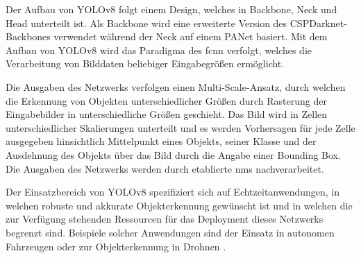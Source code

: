 Der Aufbau von YOLOv8 folgt einem Design, welches in Backbone, Neck und Head unterteilt ist. Als Backbone wird eine erweiterte Version des CSPDarknet-Backbones verwendet während der Neck auf einem PANet basiert. Mit dem Aufbau von YOLOv8 wird das Paradigma des \acf{fcnn} verfolgt, welches die Verarbeitung von Bilddaten beliebiger Eingabegrößen ermöglicht.

Die Ausgaben des Netzwerks verfolgen einen Multi-Scale-Ansatz, durch welchen die Erkennung von Objekten unterschiedlicher Größen durch Rasterung der Eingabebilder in unterschiedliche Größen geschieht. Das Bild wird in Zellen unterschiedlicher Skalierungen unterteilt und es werden Vorhersagen für jede Zelle ausgegeben hinsichtlich Mittelpunkt eines Objekts, seiner Klasse und der Ausdehnung des Objekts über das Bild durch die Angabe einer Bounding Box. Die Ausgaben des Netzwerks werden durch etablierte \ac{nms} nachverarbeitet.

Der Einsatzbereich von YOLOv8 spezifiziert sich auf Echtzeitanwendungen, in welchen robuste und akkurate Objekterkennung gewünscht ist und in welchen die zur Verfügung stehenden Ressourcen für das Deployment dieses Netzwerks begrenzt sind. Beispiele solcher Anwendungen sind der Einsatz in autonomen Fahrzeugen oder zur Objekterkennung in Drohnen \cite{yolov8_car,yolov8_drone}.

